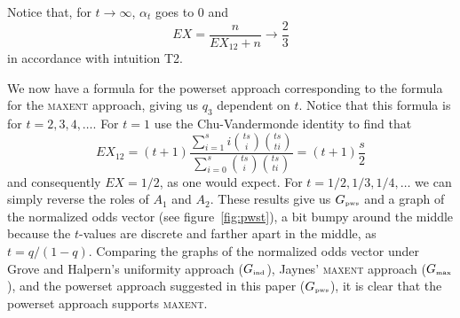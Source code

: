 \documentclass[12pt]{article}
\begin{document}
Notice that, for $t\rightarrow\infty$, $\alpha_{t}$ goes to $0$ and
\begin{displaymath}
  EX=\frac{n}{EX_{12}+n}\rightarrow\frac{2}{3}
\end{displaymath}
in accordance with intuition T2.

We now have a formula for the powerset approach corresponding to the
formula for the \textsc{maxent} approach, giving us $q_{3}$ dependent
on $t$. Notice that this formula is for $t=2,3,4,\ldots$. For $t=1$
use the Chu-Vandermonde identity to find that
\begin{displaymath}
  EX_{12}=(t+1)\frac{\sum_{i=1}^{s}i\binom{ts}{i}\binom{ts}{ti}}{\sum_{i=0}^{s}\binom{ts}{i}\binom{ts}{ti}}=(t+1)\frac{s}{2}  
\end{displaymath}
and consequently $EX=1/2$, as one would expect. For
$t=1/2,1/3,1/4,\ldots$ we can simply reverse the roles of $A_{1}$ and
$A_{2}$. These results give us $G_{\mbox{\tiny pws}}$ and a graph of
the normalized odds vector (see figure~\ref{fig:pwst}), a bit bumpy
around the middle because the $t$-values are discrete and farther
apart in the middle, as $t=q/(1-q)$. Comparing the graphs of the
normalized odds vector under Grove and Halpern's uniformity approach
($G_{\mbox{\tiny ind}}$), Jaynes' \textsc{maxent} approach
($G_{\mbox{\tiny max}}$), and the powerset approach suggested in this
paper ($G_{\mbox{\tiny pws}}$), it is clear that the powerset approach
supports \textsc{maxent}.
\end{document}
